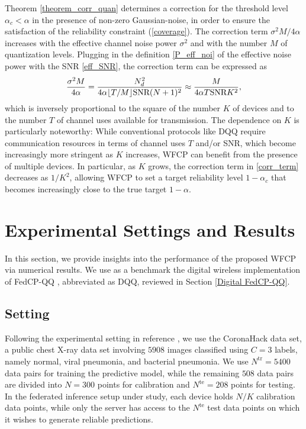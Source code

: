 \documentclass[12pt, draftclsnofoot, onecolumn]{IEEEtran}
\begin{document}
Theorem \ref{theorem_corr_quan} determines a correction for the threshold level $\alpha_c<\alpha$ in the presence of non-zero Gaussian-noise, in order to ensure the satisfaction of the reliability constraint (\ref{coverage}). The correction term $\sigma^2 M/4\alpha$ increases with the effective channel noise power $\sigma^2$ and with the number $M$ of quantization levels. Plugging in the definition \eqref{P_eff_noi} of the effective noise power with the SNR \eqref{eff_SNR}, the correction term can be expressed as
\begin{equation}\label{corr_term}
    \frac{\sigma^2 M}{4\alpha} = \frac{N_d^2}{4\alpha\lfloor T/M\rfloor \text{\rm{SNR}}(N+1)^2} \approx \frac{M}{4\alpha T\text{\rm{SNR}}K^2},
\end{equation}
which is inversely proportional to the square of the number $K$ of devices and to the number $T$ of channel uses available for transmission. The dependence on $K$ is particularly noteworthy: While conventional protocols like DQQ require communication resources in terms of channel uses $T$ and/or SNR, which become increasingly more stringent as $K$ increases, WFCP can benefit from the presence of multiple devices. In particular, as $K$ grows, the correction term in \eqref{corr_term} decreases as $1/K^2$, allowing WFCP to set a target reliability level $1-\alpha_c$ that becomes increasingly close to the true target $1-\alpha$.

\section{Experimental Settings and Results}\label{experiment}
In this section, we provide insights into the performance of the proposed WFCP via numerical results. We use as a benchmark the digital wireless implementation of FedCP-QQ \cite{FedCP-QQ}, abbreviated as DQQ, reviewed in Section \ref{Digital FedCP-QQ}.

\subsection{Setting}
Following the experimental setting in reference \cite{angelopoulos2022private}, we use the CoronaHack data set, a public chest X-ray data set involving $5908$ images classified using $C = 3$ labels, namely normal, viral pneumonia, and bacterial pneumonia. We use $N^{\text{tr}}=5400$ data pairs for training the predictive model, while the remaining $508$ data pairs are divided into $N=300$ points for calibration and $N^{\text{te}}=208$ points for testing. In the federated inference setup under study, each device  holds $N/K$ calibration data points, while only the server has access to the $N^{\text{te}}$ test data points on which it wishes to generate reliable predictions.
\end{document}
